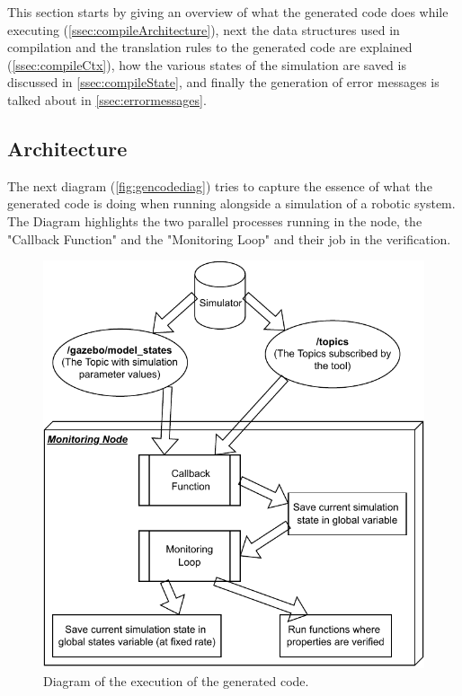 This section starts by giving an overview of what the generated code does while executing (\autoref{ssec:compileArchitecture}), next the data structures used in compilation and the translation rules to the generated code are explained (\autoref{ssec:compileCtx}), how the various states of the simulation are saved is discussed in \autoref{ssec:compileState}, and finally the generation of error messages is talked about in \autoref{ssec:errormessages}. 

\subsection{Architecture}
\label{ssec:compileArchitecture}

The next diagram (\autoref{fig:gencodediag}) tries to capture the essence of what the generated code is doing when running alongside a simulation of a robotic system. The Diagram highlights the two parallel processes running in the node, the "Callback Function" and the "Monitoring Loop" and their job in the verification.

\begin{figure}[htb]
\includegraphics{images/gen_code_diagram.pdf}
\caption{Diagram of the execution of the generated code.} \label{fig:gencodediag}
\end{figure}


